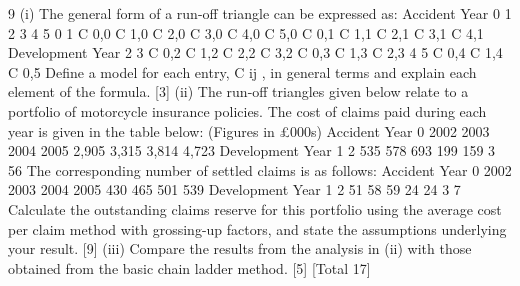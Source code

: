 
9
(i)
The general form of a run-off triangle can be expressed as:
Accident
Year
0
1
2
3
4
5
0 1
C 0,0
C 1,0
C 2,0
C 3,0
C 4,0
C 5,0 C 0,1
C 1,1
C 2,1
C 3,1
C 4,1
Development Year
2
3
C 0,2
C 1,2
C 2,2
C 3,2
C 0,3
C 1,3
C 2,3
4 5
C 0,4
C 1,4 C 0,5
Define a model for each entry, C ij , in general terms and explain each element
of the formula.
[3]
(ii)
The run-off triangles given below relate to a portfolio of motorcycle insurance
policies.
The cost of claims paid during each year is given in the table below:
(Figures in £000s)
Accident
Year
0
2002
2003
2004
2005
2,905
3,315
3,814
4,723
Development Year
1
2
535
578
693
199
159
3
56
The corresponding number of settled claims is as follows:
Accident
Year
0
2002
2003
2004
2005
430
465
501
539
Development Year
1
2
51
58
59
24
24
3
7
Calculate the outstanding claims reserve for this portfolio using the average
cost per claim method with grossing-up factors, and state the assumptions
underlying your result.
[9]
(iii)
Compare the results from the analysis in (ii) with those obtained from the
basic chain ladder method.
[5]
[Total 17]

